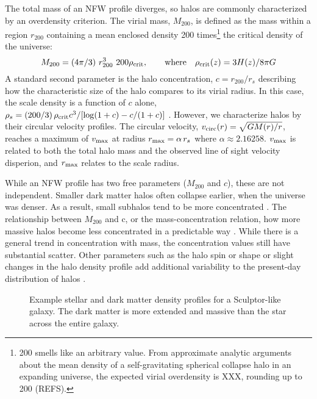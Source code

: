 The total mass of an NFW profile diverges, so halos are commonly
characterized by an overdensity criterion. The virial mass, \(M_{200}\),
is defined as the mass within a region \(r_{200}\) containing a mean
enclosed density 200 times\footnote{200 smells like an arbitrary value.
  From approximate analytic arguments about the mean density of a
  self-gravitating spherical collapse halo in an expanding universe, the
  expected virial overdensity is XXX, rounding up to 200 (REFS).} the
critical density of the universe: \begin{equation}{
M_{200} =(4\pi/3) \ r_{200}^3\ 200\rho_{\rm crit}, \qquad {\rm where} \quad \rho_{\rm crit}(z) = 3H(z) / 8\pi G
}\end{equation} A standard second parameter is the halo concentration,
\(c=r_{200} / r_s\) describing how the characteristic size of the halo
compares to its virial radius. In this case, the scale density is a
function of \(c\) alone,
\(\rho_s = (200/3)\,\rho_{\rm crit} c^3 / [\log(1+c) - c/(1+c)]\)
\citep{NFW1996}. However, we characterize halos by their circular
velocity profiles. The circular velocity,
\(v_{\rm circ}(r) = \sqrt{G M(r) / r}\), reaches a maximum of
\(v_{\rm max}\) at radius \(r_{\rm max} = \alpha\,r_s\) where
\(\alpha\approx2.16258\). \(v_{\rm max}\) is related to both the total
halo mass and the observed line of sight velocity disperion, and
\(r_{\rm max}\) relates to the scale radius.

While an NFW profile has two free parameters (\(M_{200}\) and \(c\)),
these are not independent. Smaller dark matter halos often collapse
earlier, when the universe was denser. As a result, small subhalos tend
to be more concentrated \citep[e.g.,][]{NFW1997}. The relationship
between \(M_{200}\) and c, or the mass-concentration relation, how more
massive halos become less concentrated in a predictable way
\citep[e.g.,][]{bullock+2001, ludlow+2016}. While there is a general
trend in concentration with mass, the concentration values still have
substantial scatter. Other parameters such as the halo spin or shape or
slight changes in the halo density profile add additional variability to
the present-day distribution of halos \citep[see
e.g.,][darkEXP]{navarro+2010, dicintio+2013, dutton+maccio2014}.

\begin{figure}
\centering
{}
\caption[Example density profiles]{Example stellar and dark matter
density profiles for a Sculptor-like galaxy. The dark matter is more
extended and massive than the star across the entire
galaxy.}\label{fig:nfw_density}
\end{figure}

